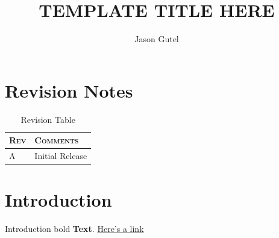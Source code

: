 \documentclass[oneside,english,chapters]{smireport}
\author{Jason Gutel}
\newcommand{\titletext}{TEMPLATE TITLE HERE}
\providecommand{\tabularnewline}{\\}
\begin{document}
\renewcommand\HeaderTitle{\titletext}{}

\renewcommand\DocNumber{9XXXX-Y}{}

\renewcommand\DocRev{A}{}

\renewcommand\SVNRevision{\$Rev\$}{}

\renewcommand\TitleBlockTitleLineOne{\titletext}{}

\renewcommand\TitleBlockTitleLineTwo{TEMPLATE Title Line 2}{}

\title{\titletext}

\maketitle
\tableofcontents{}

\listoffigures

\listoftables

\chapter{Revision Notes}
\begin{table}[H]
  \begin{tabular}{|>{\centering}p{}|>{\centering}p{}|}
    \hline
    \textbf{\textsc{Rev}} & \textbf{\textsc{Comments}}\tabularnewline
    \hline
    \hline
    A & Initial Release\tabularnewline
    \hline
  \end{tabular}
  \caption{Revision Table}\label{tab:revision-table}
\end{table}



\chapter{Introduction}
Introduction bold \textbf{Text}.
\newline
\href{https://github.com/gutelfuldead/dotfiles}{Here's a link}
\end{document}
